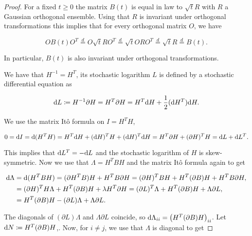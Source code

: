\begin{proof}
    For a fixed $t\ge 0$ the matrix $B(t)$ is equal in law to $\sqrt tR$ with $R$ a Gaussian orthogonal ensemble. Using that $R$ is invariant under orthogonal transformations this implies that for every orthogonal matrix $O$, we have

    \begin{equation*}
        O B(t) O^T \overset{d}{=} O \sqrt{t} R O^T \overset{d}= \sqrt{t} O R O^T \overset{d}{=} \sqrt{t} R \overset{d}{=} B(t).
    \end{equation*}

    In particular, $B(t)$ is also invariant under orthogonal transformations.

    We have that $H^{-1} = H^T$, its stochastic logarithm $L$ is defined by a stochastic differential equation as

    \begin{equation*}
        \mathrm d L \coloneqq H^{-1} \partial H = H^T \partial H = H^T \mathrm d H + \frac12 (\mathrm d H^T) \mathrm d H.
    \end{equation*}

    We use the matrix Itô formula on $I = H^T H$,

    \begin{equation*}
        0 = \mathrm d I = \mathrm d(H^T H) = H^T \mathrm d H + (\mathrm d H)^T H + (\mathrm d H)^T \mathrm d H = H^T \partial H + (\partial H)^T H = \mathrm d L + \mathrm d L^T.
    \end{equation*}

    This implies that $\mathrm d L^T = - \mathrm d L$ and the stochastic logarithm of $H$ is skew-symmetric. Now we use that $\Lambda = H^T B H$ and the matrix Itô formula again to get

    \begin{align*}
        \mathrm d \Lambda &= \mathrm d (H^T B H) = (\partial H^T B)H + H^TB\partial H = (\partial H)^T B H + H^T (\partial B) H + H^T B \partial H, \\ 
        &= (\partial H)^T H \Lambda + H^T (\partial B) H + \lambda H^T \partial H = (\partial L)^T \Lambda + H^T (\partial B) H + \Lambda \partial L, \\ 
        &= H^T (\partial B) H - (\partial L) \Lambda + \Lambda \partial L. 
    \end{align*}

    The diagonals of $(\partial L)\Lambda$ and $\Lambda \partial L$ coincide, so $\mathrm d \Lambda_{ii} = \left(H^T(\partial B)H\right)_{ii}$. Let $\mathrm d N \coloneqq H^T(\partial B)H$,. Now, for $i\neq j$, we use that $\Lambda$ is diagonal to get


\end{proof}
